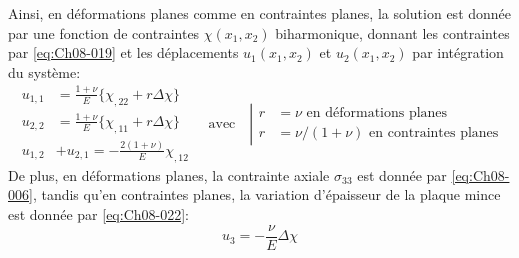 Ainsi, en déformations planes comme en contraintes planes, la solution est donnée par une fonction de contraintes $\chi(x_1,x_2)$ biharmonique, donnant les contraintes par \eqref{eq:Ch08-019} et les déplacements $u_1(x_1,x_2)$ et $u_2(x_1,x_2)$ par intégration du système:
\begin{equation}
  \begin{aligned}
    u_{1,1} & =\frac{1+\nu}{E}\{ \chi_{,22}+ r \Delta \chi \} \\
    u_{2,2} & =\frac{1+\nu}{E}\{ \chi_{,11}+ r \Delta \chi \} \\
    u_{1,2} & + u_{2,1} = -\frac{2(1+\nu)}{E}\chi_{,12}
  \end{aligned}
\quad\text{avec} \quad \left| 
  \begin{aligned}
    r & = \nu \text{ en déformations planes} \\
    r & = \nu / (1+\nu) \text{ en contraintes planes}
  \end{aligned}
  \right.\label{eq:Ch08-025}
\end{equation}
De plus, en déformations planes, la contrainte axiale $\sigma_{33}$ est donnée par \eqref{eq:Ch08-006}, tandis qu'en contraintes planes, la variation d'épaisseur de la plaque mince est donnée par \eqref{eq:Ch08-022}: 
\begin{equation}
u_3 = -\frac{\nu}{E}\Delta\chi
\label{eq:Ch08-026}
\end{equation}
